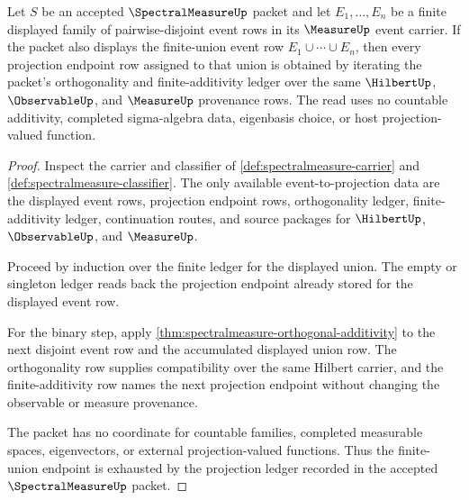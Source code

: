 \begin{theorem}
\label{thm:spectralmeasure-projection-ledger-finite-additivity}
Let $S$ be an accepted $\SpectralMeasureUp$ packet and let $E_1,\ldots,E_n$ be a finite displayed family of pairwise-disjoint event rows in its $\MeasureUp$ event carrier. If the packet also displays the finite-union event row $E_1\cup\cdots\cup E_n$, then every projection endpoint row assigned to that union is obtained by iterating the packet's orthogonality and finite-additivity ledger over the same $\HilbertUp$, $\ObservableUp$, and $\MeasureUp$ provenance rows. The read uses no countable additivity, completed sigma-algebra data, eigenbasis choice, or host projection-valued function.
\end{theorem}
\begin{proof}
Inspect the carrier and classifier of \autoref{def:spectralmeasure-carrier} and \autoref{def:spectralmeasure-classifier}. The only available event-to-projection data are the displayed event rows, projection endpoint rows, orthogonality ledger, finite-additivity ledger, continuation routes, and source packages for $\HilbertUp$, $\ObservableUp$, and $\MeasureUp$.

Proceed by induction over the finite ledger for the displayed union. The empty or singleton ledger reads back the projection endpoint already stored for the displayed event row.

For the binary step, apply \autoref{thm:spectralmeasure-orthogonal-additivity} to the next disjoint event row and the accumulated displayed union row. The orthogonality row supplies compatibility over the same Hilbert carrier, and the finite-additivity row names the next projection endpoint without changing the observable or measure provenance.

The packet has no coordinate for countable families, completed measurable spaces, eigenvectors, or external projection-valued functions. Thus the finite-union endpoint is exhausted by the projection ledger recorded in the accepted $\SpectralMeasureUp$ packet.
\end{proof}

